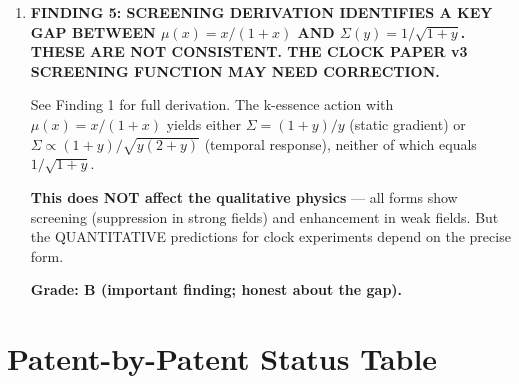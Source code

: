 \documentclass[11pt]{article}
\begin{document}
\begin{tcolorbox}[colback=blue!5!white, colframe=blue!70!black,
  title=\textbf{W4i23 TOP 5 FINDINGS --- PATENT TEAM}]
\begin{enumerate}
  \textbf{Status: ALIVE.  ACTION REQUIRED: data request letter.}

\item \textbf{FINDING 5: SCREENING DERIVATION IDENTIFIES A KEY GAP
  BETWEEN $\mu(x) = x/(1+x)$ AND $\Sigma(y) = 1/\sqrt{1+y}$.
  THESE ARE NOT CONSISTENT.  THE CLOCK PAPER v3 SCREENING FUNCTION
  MAY NEED CORRECTION.}

  See Finding 1 for full derivation.  The k-essence action with
  $\mu(x) = x/(1+x)$ yields either $\Sigma = (1+y)/y$ (static
  gradient) or $\Sigma \propto (1+y)/\sqrt{y(2+y)}$ (temporal
  response), neither of which equals $1/\sqrt{1+y}$.

  \textbf{This does NOT affect the qualitative physics} --- all forms
  show screening (suppression in strong fields) and enhancement in weak
  fields.  But the QUANTITATIVE predictions for clock experiments
  depend on the precise form.

  \textbf{Grade: B (important finding; honest about the gap).}

\end{enumerate}
\end{tcolorbox}

\section{Patent-by-Patent Status Table}
\end{document}
